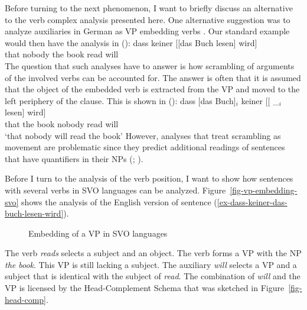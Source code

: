 Before turning to the next phenomenon, I want to briefly discuss an alternative to the verb complex
analysis presented here. One alternative suggestion was to analyze auxiliaries in German as VP
embedding verbs \citep{Wurmbrand2003b}. Our standard example would then have the analysis in ():
\ea
\gll dass keiner [[das Buch lesen] wird]\\
     that nobody \hphantom{[[}the book read will\\
\z
The question that such analyses have to answer is how scrambling of arguments of the involved verbs
can be accounted for. The answer is often that it is assumed that the object of the embedded verb is
extracted from the VP and moved to the left periphery of the clause. This is shown in ():
\ea
\gll dass [das Buch]$_i$ keiner [[ \_$_i$ lesen] wird]\\
     that \spacebr{}the book nobody {} {} read will\\
\glt `that nobody will read the book'
\z
However, analyses that treat scrambling as movement are problematic since they predict additional
readings of sentences that have quantifiers in their NPs (\citealp[]{Kiss2001a}; \citealp[Section~2.6]{Fanselow2001a}).


Before I turn to the analysis of the verb position, I want to show how sentences with several verbs
\label{page-English-Aux-VPs}
in SVO languages can be analyzed. Figure~\vref{fig-vp-embedding-svo} shows the analysis of the English version of sentence
(\ref{ex-dass-keiner-das-buch-lesen-wird}).
\begin{figure}
\caption{\label{fig-vp-embedding-svo}Embedding of a VP in SVO languages}
\end{figure}
The verb \emph{reads} selects a subject and an object. The verb forms a VP with the NP \emph{the
  book}. This VP is still lacking a subject. The auxiliary \emph{will} selects a VP and a subject
that is identical with the subject of \emph{read}. The combination of \emph{will} and the VP is
licensed by the Head-Complement Schema that was sketched in Figure~\vref{fig-head-comp}.

